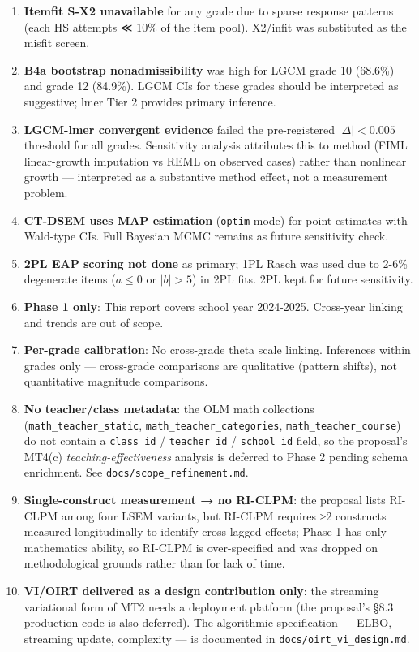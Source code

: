 \documentclass[
]{article}
\begin{document}
\begin{enumerate}
\def\labelenumi{\arabic{enumi}.}
\item
  \textbf{Itemfit S-X2 unavailable} for any grade due to sparse response
  patterns (each HS attempts ≪ 10\% of the item pool). X2/infit was
  substituted as the misfit screen.
\item
  \textbf{B4a bootstrap nonadmissibility} was high for LGCM grade 10
  (68.6\%) and grade 12 (84.9\%). LGCM CIs for these grades should be
  interpreted as suggestive; lmer Tier 2 provides primary inference.
\item
  \textbf{LGCM-lmer convergent evidence} failed the pre-registered
  \(|\Delta| < 0.005\) threshold for all grades. Sensitivity analysis
  attributes this to method (FIML linear-growth imputation vs REML on
  observed cases) rather than nonlinear growth --- interpreted as a
  substantive method effect, not a measurement problem.
\item
  \textbf{CT-DSEM uses MAP estimation} (\texttt{optim} mode) for point
  estimates with Wald-type CIs. Full Bayesian MCMC remains as future
  sensitivity check.
\item
  \textbf{2PL EAP scoring not done} as primary; 1PL Rasch was used due
  to 2-6\% degenerate items (\(a \le 0\) or \(|b| > 5\)) in 2PL fits.
  2PL kept for future sensitivity.
\item
  \textbf{Phase 1 only}: This report covers school year 2024-2025.
  Cross-year linking and trends are out of scope.
\item
  \textbf{Per-grade calibration}: No cross-grade theta scale linking.
  Inferences within grades only --- cross-grade comparisons are
  qualitative (pattern shifts), not quantitative magnitude comparisons.
\item
  \textbf{No teacher/class metadata}: the OLM math collections
  (\texttt{math\_teacher\_static}, \texttt{math\_teacher\_categories},
  \texttt{math\_teacher\_course}) do not contain a \texttt{class\_id} /
  \texttt{teacher\_id} / \texttt{school\_id} field, so the proposal's
  MT4(c) \emph{teaching-effectiveness} analysis is deferred to Phase 2
  pending schema enrichment. See \texttt{docs/scope\_refinement.md}.
\item
  \textbf{Single-construct measurement → no RI-CLPM}: the proposal lists
  RI-CLPM among four LSEM variants, but RI-CLPM requires ≥2 constructs
  measured longitudinally to identify cross-lagged effects; Phase 1 has
  only mathematics ability, so RI-CLPM is over-specified and was dropped
  on methodological grounds rather than for lack of time.
\item
  \textbf{VI/OIRT delivered as a design contribution only}: the
  streaming variational form of MT2 needs a deployment platform (the
  proposal's §8.3 production code is also deferred). The algorithmic
  specification --- ELBO, streaming update, complexity --- is documented
  in \texttt{docs/oirt\_vi\_design.md}.
\end{enumerate}
\end{document}

